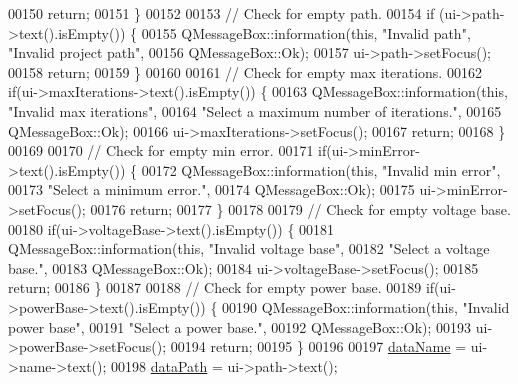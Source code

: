 \begin{DoxyCode}
00150     \textcolor{keywordflow}{return};
00151   \}
00152 
00153   \textcolor{comment}{// Check for empty path.}
00154   \textcolor{keywordflow}{if} (ui->path->text().isEmpty()) \{
00155     QMessageBox::information(\textcolor{keyword}{this}, \textcolor{stringliteral}{"Invalid path"}, \textcolor{stringliteral}{"Invalid project path"},
00156                              QMessageBox::Ok);
00157     ui->path->setFocus();
00158     \textcolor{keywordflow}{return};
00159   \}
00160 
00161   \textcolor{comment}{// Check for empty max iterations.}
00162   \textcolor{keywordflow}{if}(ui->maxIterations->text().isEmpty()) \{
00163     QMessageBox::information(\textcolor{keyword}{this}, \textcolor{stringliteral}{"Invalid max iterations"},
00164                              \textcolor{stringliteral}{"Select a maximum number of iterations."},
00165                              QMessageBox::Ok);
00166     ui->maxIterations->setFocus();
00167     \textcolor{keywordflow}{return};
00168   \}
00169 
00170   \textcolor{comment}{// Check for empty min error.}
00171   \textcolor{keywordflow}{if}(ui->minError->text().isEmpty()) \{
00172     QMessageBox::information(\textcolor{keyword}{this}, \textcolor{stringliteral}{"Invalid min error"},
00173                              \textcolor{stringliteral}{"Select a minimum error."},
00174                              QMessageBox::Ok);
00175     ui->minError->setFocus();
00176     \textcolor{keywordflow}{return};
00177   \}
00178 
00179   \textcolor{comment}{// Check for empty voltage base.}
00180   \textcolor{keywordflow}{if}(ui->voltageBase->text().isEmpty()) \{
00181     QMessageBox::information(\textcolor{keyword}{this}, \textcolor{stringliteral}{"Invalid voltage base"},
00182                              \textcolor{stringliteral}{"Select a voltage base."},
00183                              QMessageBox::Ok);
00184     ui->voltageBase->setFocus();
00185     \textcolor{keywordflow}{return};
00186   \}
00187 
00188   \textcolor{comment}{// Check for empty power base.}
00189   \textcolor{keywordflow}{if}(ui->powerBase->text().isEmpty()) \{
00190     QMessageBox::information(\textcolor{keyword}{this}, \textcolor{stringliteral}{"Invalid power base"},
00191                              \textcolor{stringliteral}{"Select a power base."},
00192                              QMessageBox::Ok);
00193     ui->powerBase->setFocus();
00194     \textcolor{keywordflow}{return};
00195   \}
00196 
00197   \hyperlink{class_new_project_ad0ebf4e6b19dbdf3a9ad4af27df2a8fa}{dataName} = ui->name->text();
00198   \hyperlink{class_new_project_ac684c762d3c15ff4463622978193e827}{dataPath} = ui->path->text();

\end{DoxyCode}
